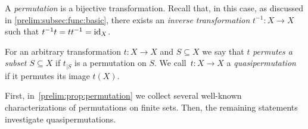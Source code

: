 
A \emph{permutation} is a bijective transformation.
Recall that, in this case, as discussed in \cref{prelim:subsec:func:basic}, 
there exists an \emph{inverse transformation} $t^{-1} \colon X \to X$
such that $\concat{t}{t^{-1}} = \concat{t^{-1}}{t} = \operatorname{id}_X$.


For an arbitrary transformation $t \colon X \to X$
and $S \subseteq X$ we say that $t$ \emph{permutes a subset $S \subseteq X$} 
if $t_{|S}$ is a permutation on $S$. 
We call~$t \colon X \to X$ a \emph{quasipermutation}~\cite{GorKou95} if it permutes its image $t(X)$.

First, in~\cref{prelim:prop:permutation} we collect several well-known characterizations of permutations
on finite sets. Then, the remaining statements investigate quasipermutations.

